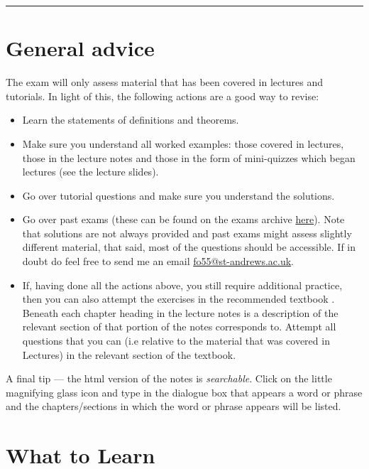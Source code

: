 \documentclass[
  a4paper,
  oneside,
  final]{krantz}
\providecommand{\tightlist}{%
  \setlength{\itemsep}{0pt}\setlength{\parskip}{0pt}}
\theoremstyle{definition}
\theoremstyle{definition}
\theoremstyle{definition}
\theoremstyle{definition}
\theoremstyle{remark}
\begin{document}
\begin{center}\rule{0.5\linewidth}{0.5pt}\end{center}

\hypertarget{General-advice}{%
\section{General advice}\label{General-advice}}

The exam will only assess material that has been covered in lectures and tutorials. In light of this, the following actions are a good way to revise:

\begin{itemize}
\tightlist
\item
  Learn the statements of definitions and theorems.
\item
  Make sure you understand all worked examples: those covered in lectures, those in the lecture notes and those in the form of mini-quizzes which began lectures (see the lecture slides).
\item
  Go over tutorial questions and make sure you understand the solutions.
\item
  Go over past exams (these can be found on the exams archive \href{https://www.st-andrews.ac.uk/~mcsexams/a/oo/L4Q.html}{here}). Note that solutions are not always provided and past exams might assess slightly different material, that said, most of the questions should be accessible. If in doubt do feel free to send me an email \url{fo55@st-andrews.ac.uk}.
\item
  If, having done all the actions above, you still require additional practice, then you can also attempt the exercises in the recommended textbook \citep{ASY}. Beneath each chapter heading in the lecture notes is a description of the relevant section of \citep{ASY} that portion of the notes corresponds to. Attempt all questions that you can (i.e relative to the material that was covered in Lectures) in the relevant section of the textbook.
\end{itemize}

A final tip --- the html version of the notes is \emph{searchable}. Click on the little magnifying glass icon and type in the dialogue box that appears a word or phrase and the chapters/sections in which the word or phrase appears will be listed.

\hypertarget{what-to-learn}{%
\section{What to Learn}\label{what-to-learn}}
\end{document}
